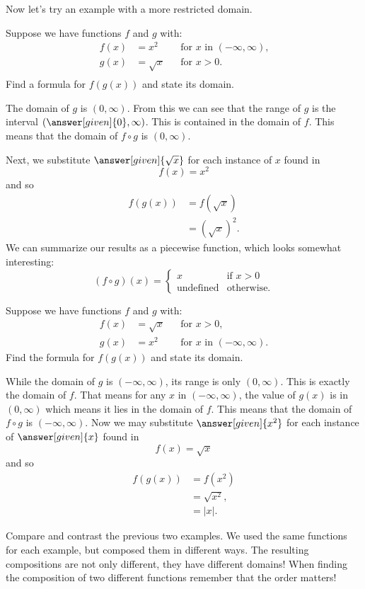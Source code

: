 \documentclass{ximera}
\begin{document}
Now let's try an example with a more restricted domain.

\begin{example}
 Suppose we have functions $f$ and $g$ with:
\begin{align*}
  f(x)&=x^2 &&\text{for $x$ in  $(-\infty, \infty)$,}\\
  g(x)&= \sqrt{x} &&\text{for $x > 0$.}\\
\end{align*}
Find a formula for $f(g(x))$ and state its domain.
\begin{explanation}
  The domain of $g$ is $(0, \infty)$. From this we can see that the
  range of $g$ is the interval  $\left( \answer[given]{0},  \infty \right)$. This is contained
  in the domain of $f$.
  This means that the domain of $f\circ g$ is $(0, \infty)$.  
  
  Next, we substitute $\answer[given]{\sqrt{x}}$ for each instance of $x$ found in
  \[
  f(x)={{x}^{2}}
  \]
  and so
  \begin{align*}
  f(g(x))&=f(\sqrt{x})\\
  &=\left(\sqrt{x}\right)^2.
  \end{align*}
  We can summarize our results as a piecewise function, which
  looks somewhat interesting:
  \[
  (f\circ g)(x) = 
  \begin{cases}
    x & \text{if $x > 0$}\\
   \text{undefined} &\text{otherwise}. 
  \end{cases}
  \]
\end{explanation}
\end{example}


\begin{example}
 Suppose we have functions $f$ and $g$ with:
\begin{align*}
  f(x)&=\sqrt{x} &&\text{for $x > 0$,}\\
  g(x)&= x^2 &&\text{for $x$ in $(-\infty, \infty)$.}
\end{align*}
Find the formula for $f(g(x))$ and state its domain.
\begin{explanation}
  While the domain of $g$ is $(-\infty, \infty)$, its range is only
  $(0, \infty)$. This is exactly the domain of $f$. 
  That means for any $x$ in $(-\infty, \infty)$, the value of $g(x)$ is in $(0,\infty)$ which means it lies in the
  domain of $f$.
  This means that the domain of $f\circ g$ is $(-\infty, \infty)$. %
  Now we may substitute $\answer[given]{x^2}$ for each instance of
  $\answer[given]{x}$ found in
  \[
  f(x)=\sqrt{x}
  \]
  and so
  \begin{align*}
  f(g(x))&=f(x^2)\\
  &=\sqrt{x^2},\\
  &=|x|.
  \end{align*}
\end{explanation}
\end{example}

Compare and contrast the previous two examples.  We used the same
functions for each example, but composed them in different ways.  The resulting
compositions are not only different, they have different domains! When finding the composition of two different functions
remember that the order matters!
\end{document}

